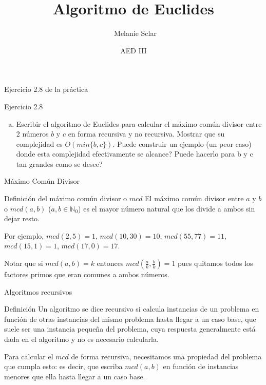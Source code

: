 \documentclass[compress]{beamer}
\title[Algoritmo de Euclides] %
{Algoritmo de Euclides}
\author[Melanie Sclar] %
{~Melanie Sclar}
\institute[UBA] %
{
  Facultad de Ciencias Exactas y Naturales\\
  Universidad de Buenos Aires
}
\date[AED III] %
{AED III}
\begin{document}
\begin{frame}
  \titlepage
\end{frame}

\begin{frame}{Ejercicio 2.8 de la pr\'actica}
\begin{block}{Ejercicio 2.8}
\begin{enumerate}[a.]
\item Escribir el algoritmo de Euclides para calcular el m\'aximo com\'un divisor entre 2 n\'umeros $b$ y $c$ en forma
recursiva y no recursiva. Mostrar que su complejidad es $O(min\{b,c\})$. Puede construir un ejemplo (un
peor caso) donde esta complejidad efectivamente se alcance? \textquestiondown Puede hacerlo para b y c tan grandes
como se desee?
\end{enumerate}
\end{block}  
\end{frame}

\begin{frame}{M\'aximo Com\'un Divisor}
\begin{block}{Definici\'on del m\'aximo com\'un divisor o $mcd$}
El m\'aximo com\'un divisor entre $a$ y $b$ o $mcd(a,b)$ ($a, b \in \mathbb{N}_0$) es el mayor n\'umero natural que los divide a ambos sin dejar resto. 
\end{block}  

Por ejemplo, $mcd(2,5) = 1$, $mcd(10,30) = 10$, $mcd(55,77) = 11$, $mcd(15,1) = 1$, $mcd(17,0) = 17$. \\
\bigskip

Notar que si $mcd(a,b) = k$ entonces $mcd(\frac{a}{k}, \frac{b}{k}) = 1$ pues quitamos todos los factores primos que eran comunes a ambos n\'umeros.

\end{frame}

\begin{frame}{Algoritmos recursivos}
	\begin{block}{Definici\'on}
	Un algoritmo se dice recursivo si calcula instancias de un problema en funci\'on de otras instancias del mismo problema hasta llegar a un caso base, que suele ser una instancia pequeña del problema, cuya respuesta generalmente est\'a dada en el algoritmo y no es necesario calcularla.
	\end{block}
\bigskip
  Para calcular el $mcd$ de forma recursiva, necesitamos una propiedad del problema que cumpla esto: es decir, que escriba $mcd(a,b)$ en funci\'on de instancias menores que ella hasta llegar a un caso base.
\end{frame}
\end{document}
